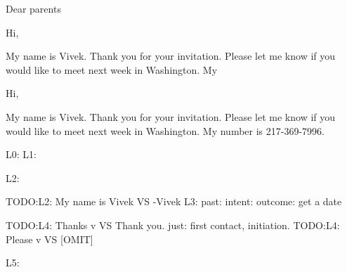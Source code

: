 \documentclass[serif, mathserif, final]{beamer}
\begin{document}
\begin{frame}[label=socialInt]
\begin{block}
Dear parents




Hi,

My name is Vivek. Thank you for your invitation. Please let me know if 
you would like to meet next week in Washington. My


Hi,

My name is Vivek. Thank you for your invitation. Please let me know if
you would like to meet next week in Washington. My number is
217-369-7996.

L0: 
L1: 

L2: 

TODO:L2: My name is Vivek VS -Vivek
L3: past:  intent:  outcome: get a date  

TODO:L4: Thanks v VS Thank you.  just: first contact, initiation.
TODO:L4: Please v VS [OMIT]  

L5: 

\end{block}

\end{frame}
\end{document}
